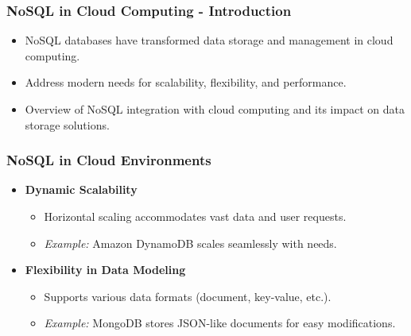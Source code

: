\documentclass[aspectratio=169]{beamer}
\begin{document}
\begin{frame}[fragile]
    \frametitle{NoSQL in Cloud Computing - Introduction}
    \begin{itemize}
        \item NoSQL databases have transformed data storage and management in cloud computing.
        \item Address modern needs for scalability, flexibility, and performance.
        \item Overview of NoSQL integration with cloud computing and its impact on data storage solutions.
    \end{itemize}
\end{frame}

\begin{frame}[fragile]
    \frametitle{NoSQL in Cloud Environments}
    \begin{itemize}
        \item \textbf{Dynamic Scalability}
            \begin{itemize}
                \item Horizontal scaling accommodates vast data and user requests.
                \item \textit{Example:} Amazon DynamoDB scales seamlessly with needs.
            \end{itemize}
        
        \item \textbf{Flexibility in Data Modeling}
            \begin{itemize}
                \item Supports various data formats (document, key-value, etc.).
                \item \textit{Example:} MongoDB stores JSON-like documents for easy modifications.
            \end{itemize}
    \end{itemize}
\end{frame}
\end{document}
